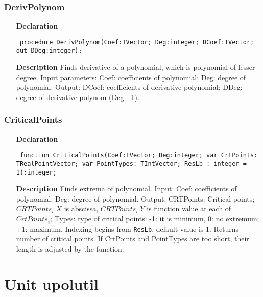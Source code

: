 \documentclass[12pt,a4paper,oneside]{report}
\newcommand{\declarationitem}[1]{\textbf{#1}}
\newcommand{\descriptiontitle}[1]{\textbf{#1}}
\newcommand{\code}[1]{\texttt{#1}}
\begin{document}
\subsubsection{DerivPolynom}
\label{ucrtptpol-DerivPolynom}
\begin{itemize}\item[\declarationitem{Declaration}\hfill]
	\begin{flushleft}
		\code{
			procedure DerivPolynom(Coef:TVector; Deg:integer; DCoef:TVector; out DDeg:integer);}
		
	\end{flushleft}
	
	\par
	\item[\descriptiontitle{Description}]
	Finds derivative of a polynomial, which is polynomial of lesser degree. Input parameters: Coef: coefficients of polynomial; Deg: degree of polynomial. Output: DCoef: coefficients of derivative polynomial; DDeg: degree of derivative polynom (Deg - 1).
	
\end{itemize}
\subsubsection{CriticalPoints}
\label{ucrtptpol-CriticalPoints}
\begin{itemize}\item[\declarationitem{Declaration}\hfill]
	\begin{flushleft}
		\code{
			function CriticalPoints(Coef:TVector; Deg:integer; var CrtPoints: TRealPointVector; var PointTypes: TIntVector; ResLb : integer = 1):integer;}
	\end{flushleft}
	\item[\descriptiontitle{Description}]
	Finds extrema of polynomial.  Input: Coef: coefficients of polynomial; Deg: degree of polynomial. Output: CRTPoints: Critical points; $CRTPoints_i.X$ is abscissa, $CRTPoints_i.Y$ is function value at each of $CrtPoints_i$; Types: type of critical points: -1: it is minimum, 0: no extremum; +1: maximum. Indexing begins from \code{ResLb}, default value is 1. Returns number of critical points. If CrtPoints and PointTypes are too short, their length is adjusted by the function. 
\end{itemize}
\section{Unit upolutil}
\label{upolutil}
\end{document}
